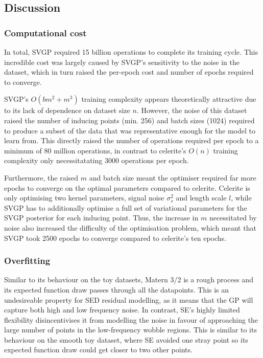 \subsection{Discussion}
\subsubsection{Computational cost}
In total, SVGP required 15 billion operations to complete its training cycle. This incredible cost was largely caused by SVGP's sensitivity to the noise in the dataset, which in turn raised the per-epoch cost and number of epochs required to converge.

SVGP's $O(bm^2 + m^3)$ training complexity appears theoretically attractive due to its lack of dependence on dataset size $n$. However, the noise of this dataset raised the number of inducing points (min. 256) and batch sizes (1024) required to produce a subset of the data that was representative enough for the model to learn from. This directly raised the number of operations required per epoch to a minimum of 80 million operations, in contrast to celerite's $O(n)$ training complexity only necessitatating 3000 operations per epoch.

Furthermore, the raised $m$ and batch size meant the optimiser required far more epochs to converge on the optimal parameters compared to celerite. Celerite is only optimising two kernel parameters, signal noise $\sigma_s^2$ and length scale $l$, while SVGP has to additionally optimise a full set of variational parameters for the SVGP posterior \label{eq:svgp_posterior} for each inducing point. Thus, the increase in $m$ necessitated by noise also increased the difficulty of the optimisation problem, which meant that SVGP took 2500 epochs to converge compared to celerite's ten epochs.

\subsubsection{Overfitting}
Similar to its behaviour on the toy datasets, Matern 3/2 is a rough process and its expected function draw passes through all the datapoints. This is an undesireable property for SED residual modelling, as it means that the GP will capture both high and low frequency noise. In contrast, SE's highly limited flexibility disincentivises it from modelling the noise in favour of approaching the large number of points in the low-frequency wobble regions. This is similar to its behaviour on the smooth toy dataset, where SE avoided one stray point so its expected function draw could get closer to two other points.

